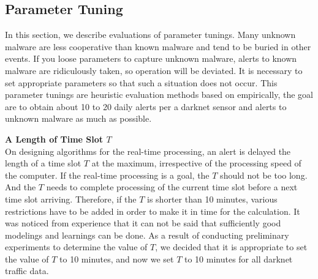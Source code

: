 \documentclass{sig-alternate-10pt}
\begin{document}
\subsection{Parameter Tuning}
In this section, we describe evaluations of parameter tunings.
Many unknown malware are less cooperative than known malware and tend to be buried in other events.
If you loose parameters to capture unknown malware, alerts to known malware are ridiculously taken, so operation will be deviated.
It is necessary to set appropriate parameters so that such a situation does not occur.
This parameter tunings are heuristic evaluation methods based on empirically, the goal are to obtain about 10 to 20 daily alerts per a darknet sensor and alerts to unknown malware as much as possible.

\vspace*{0.3 cm}
\noindent
\textbf{A Length of Time Slot $T$}\\
On designing algorithms for the real-time processing, an alert is delayed the length of a time slot $T$ at the maximum, irrespective of the processing speed of the computer.
If the real-time processing is a goal, the $T$ should not be too long.
And the $T$ needs to complete processing of the current time slot before a next time slot arriving.
Therefore, if the $T$ is shorter than 10 minutes, various restrictions have to be added in order to make it in time for the calculation.
It was noticed from experience that it can not be said that sufficiently good modelings and learnings can be done.
As a result of conducting preliminary experiments to determine the value of $T$, we decided that it is appropriate to set the value of $T$ to 10 minutes, and now we set $T$ to 10 minutes for all darknet traffic data.
\end{document}
